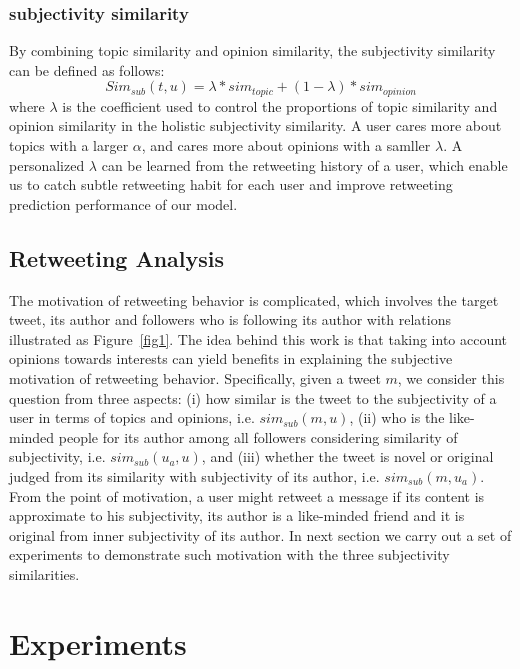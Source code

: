 \documentclass[letterpaper]{article}
\begin{document}
\subsubsection{subjectivity similarity}

By combining topic similarity and opinion similarity, the subjectivity similarity can be defined as follows:
\begin{equation}
Sim_{sub} \left( t,u \right) = \lambda * sim_{topic}+\left( 1-\lambda \right)*sim_{opinion}
\end{equation}
where $ \lambda $ is the coefficient used to control the proportions of topic similarity and opinion similarity in the holistic subjectivity similarity. 
A user cares more about topics with a larger $ \alpha $, and cares more about opinions with a samller $ \lambda $. 
A personalized $ \lambda $ can be learned from the retweeting history of a user, which enable us to catch subtle retweeting habit for each user and improve retweeting prediction performance of our model. 

\subsection{Retweeting Analysis}
\label{analysis}

The motivation of retweeting behavior is complicated, which involves the target tweet, its author and followers who is following its author with relations illustrated as Figure~\ref{fig1}. 
The idea behind this work is that taking into account opinions towards interests can yield benefits in explaining the subjective motivation of retweeting behavior. 
Specifically, given a tweet $ m $, we consider this question from three aspects: 
(i) how similar is the tweet to the subjectivity of a user in terms of topics and opinions, i.e. $ sim_{sub} \left( m,u \right) $, (ii) who is the like-minded people for its author among all followers considering similarity of subjectivity, i.e. $ sim_{sub}\left( u_{a},u \right)  $, and (iii) whether the tweet is novel or original judged from its similarity with subjectivity of its author, i.e. $ sim_{sub}\left( m,u_{a} \right)  $. 
From the point of motivation, a user might retweet a message if its content is approximate to his subjectivity, its author is a like-minded friend and it is original from inner subjectivity of its author. 
In next section we carry out a set of experiments to demonstrate such motivation with the three subjectivity similarities. 

\section{Experiments}
\label{experiments}
\end{document}
